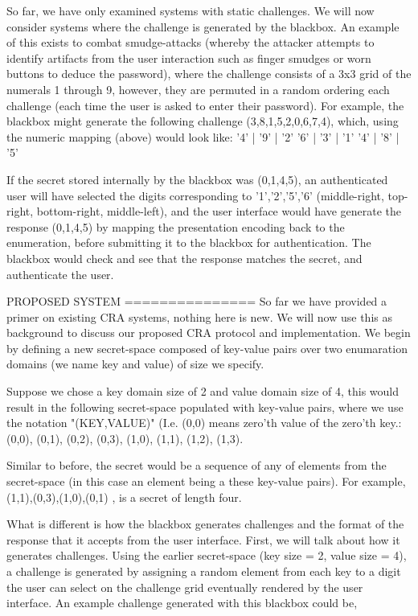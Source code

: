 \documentclass[12pt]{document}
\begin{document}
\begin{Introduction}
So far, we have only examined systems with static challenges. We will now consider systems where the challenge is generated by the blackbox.
An example of this exists to combat smudge-attacks (whereby the attacker attempts to identify artifacts from the user interaction such as finger smudges or worn buttons to deduce the password), where the challenge consists of a 3x3 grid of the numerals 1 through 9, however, they are permuted in a random ordering each challenge (each time the user is asked to enter their password).
For example, the blackbox might generate the following challenge (3,8,1,5,2,0,6,7,4), which, using the numeric mapping (above) would look like:
'4' | '9' | '2'
'6' | '3' | '1'
'4' | '8' | '5'

If the secret stored internally by the blackbox was (0,1,4,5), an authenticated user will have selected the digits corresponding to '1','2','5','6' (middle-right, top-right, bottom-right, middle-left), and the user interface would have generate the response (0,1,4,5) by mapping the presentation encoding back to the enumeration, before submitting it to the blackbox for authentication. The blackbox would check and see that the response matches the secret, and authenticate the user.


PROPOSED SYSTEM
===============
So far we have provided a primer on existing CRA systems, nothing here is new. We will now use this as background to discuss our proposed CRA protocol and implementation.
We begin by defining a new secret-space composed of key-value pairs over two enumaration domains (we name key and value) of size we specify.

Suppose we chose a key domain size of 2 and value domain size of 4, this would result in the following secret-space populated with key-value pairs, where we use the notation "(KEY,VALUE)" (I.e. (0,0) means zero'th value of the zero'th key.:
  (0,0), (0,1), (0,2), (0,3),
  (1,0), (1,1), (1,2), (1,3).


Similar to before, the secret would be a sequence of any of elements from the secret-space (in this case an element being a these key-value pairs).
For example,
  (1,1),(0,3),(1,0),(0,1)
, is a secret of length four. 

What is different is how the blackbox generates challenges and the format of the response that it accepts from the user interface.
First, we will talk about how it generates challenges.
Using the earlier secret-space (key size = 2, value size = 4), a challenge is generated by assigning a random element from each key to a digit the user can select on the challenge grid eventually rendered by the user interface.
An example challenge generated with this blackbox could be,


\end{Introduction}
\end{document}

